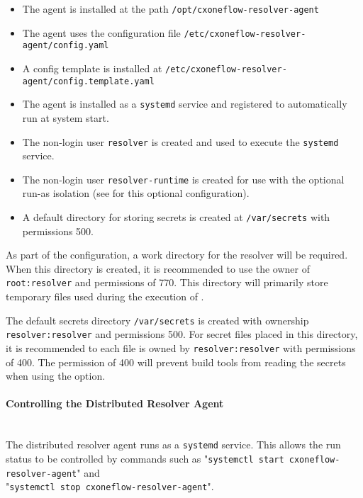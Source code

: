\begin{itemize}
  \item The agent is installed at the path \texttt{/opt/cxoneflow-resolver-agent}
  \item The agent uses the configuration file \texttt{/etc/cxoneflow-resolver-agent/config.yaml}
  \item A config template is installed at \texttt{/etc/cxoneflow-resolver-agent/config.template.yaml}
  \item The agent is installed as a \texttt{systemd} service and registered to automatically run at system start.
  \item The non-login user \texttt{resolver} is created and used to execute the \texttt{systemd} service.
  \item The non-login user \texttt{resolver-runtime} is created for use with the optional run-as isolation
    (see  for this optional configuration).
  \item A default directory for storing secrets is created at \texttt{/var/secrets} with permissions 500.
\end{itemize}

As part of the configuration, a work directory for the resolver will be required.  When this directory
is created, it is recommended to use the owner of \texttt{root:resolver} and permissions of 770.  This
directory will primarily store temporary files used during the execution of \scaresolver.

The default secrets directory \texttt{/var/secrets} is created with ownership \texttt{resolver:resolver} and
permissions 500.  For secret files placed in this directory, it is recommended to each file is owned
by \texttt{resolver:resolver} with permissions of 400.  The permission of 400 will prevent 
build tools from reading the secrets when using the  option.

\paragraph{Controlling the Distributed Resolver Agent}
\noindent\\The distributed resolver agent runs as a \texttt{systemd} service.  This allows the run status to be controlled
by commands such as "\texttt{systemctl start cxoneflow-resolver-agent}" and\\"\texttt{systemctl stop cxoneflow-resolver-agent}".

